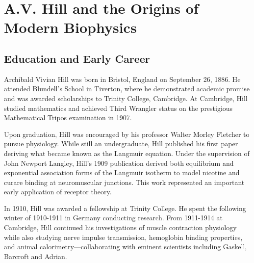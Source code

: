 \chapter{A.V. Hill and the Origins of Modern Biophysics}
\label{ch23}



\section{Education and Early Career}

Archibald Vivian Hill was born in Bristol, England on September 26, 1886. He attended Blundell's School in Tiverton, where he demonstrated academic promise and was awarded scholarships to Trinity College, Cambridge. At Cambridge, Hill studied mathematics and achieved Third Wrangler status on the prestigious Mathematical Tripos examination in 1907.

Upon graduation, Hill was encouraged by his professor Walter Morley Fletcher to pursue physiology. While still an undergraduate, Hill published his first paper deriving what became known as the Langmuir equation. Under the supervision of John Newport Langley, Hill's 1909 publication derived both equilibrium and exponential association forms of the Langmuir isotherm to model nicotine and curare binding at neuromuscular junctions. This work represented an important early application of receptor theory.

In 1910, Hill was awarded a fellowship at Trinity College. He spent the following winter of 1910-1911 in Germany conducting research. From 1911-1914 at Cambridge, Hill continued his investigations of muscle contraction physiology while also studying nerve impulse transmission, hemoglobin binding properties, and animal calorimetry—collaborating with eminent scientists including Gaskell, Barcroft and Adrian.

